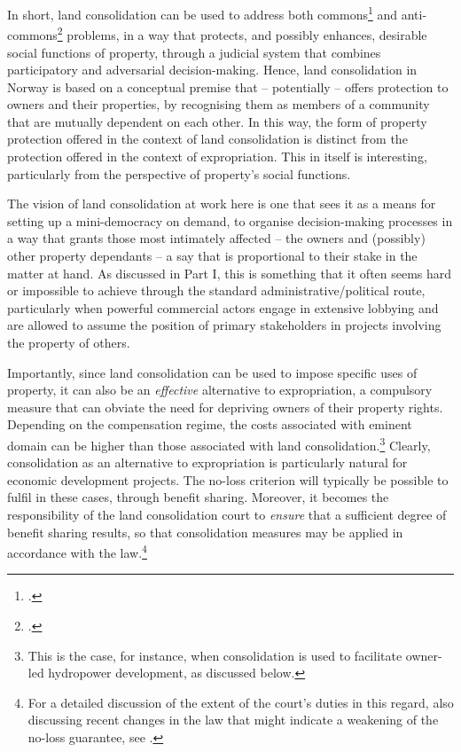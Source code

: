 In short, land consolidation can be used to address both commons\footcite{hardin68} and anti-commons\footcite{heller98} problems, in a way that protects, and possibly enhances, desirable social functions of property, through a judicial system that combines participatory and adversarial decision-making. Hence, land consolidation in Norway is based on a conceptual premise that -- potentially -- offers protection to owners and their properties, by recognising them as members of a community that are mutually dependent on each other. In this way, the form of property protection offered in the context of land consolidation is distinct from the protection offered in the context of expropriation. This in itself is interesting, particularly from the perspective of property's social functions.

The vision of land consolidation at work here is one that sees it as a means for setting up a mini-democracy on demand, to organise decision-making processes in a way that grants those most intimately affected -- the owners and (possibly) other property dependants -- a say that is proportional to their stake in the matter at hand. As discussed in Part I, this is something that it often seems hard or impossible to achieve through the standard administrative/political route, particularly when powerful commercial actors engage in extensive lobbying and are allowed to assume the position of primary stakeholders in projects involving the property of others.

Importantly, since land consolidation can be used to impose specific uses of property, it can also be an {\it effective} alternative to expropriation, a compulsory measure that can obviate the need for depriving owners of their property rights. Depending on the compensation regime, the costs associated with eminent domain can be higher than those associated with land consolidation.\footnote{This is the case, for instance, when consolidation is used to facilitate owner-led hydropower development, as discussed below.} Clearly, consolidation as an alternative to expropriation is particularly natural for economic development projects. The no-loss criterion will typically be possible to fulfil in these cases, through benefit sharing. Moreover, it becomes the responsibility of the land consolidation court to {\it ensure} that a sufficient degree of benefit sharing results, so that consolidation measures may be applied in accordance with the law.\footnote{For a detailed discussion of the extent of the court's duties in this regard, also discussing recent changes in the law that might indicate a weakening of the no-loss guarantee, see \cite{hauge15}.}

